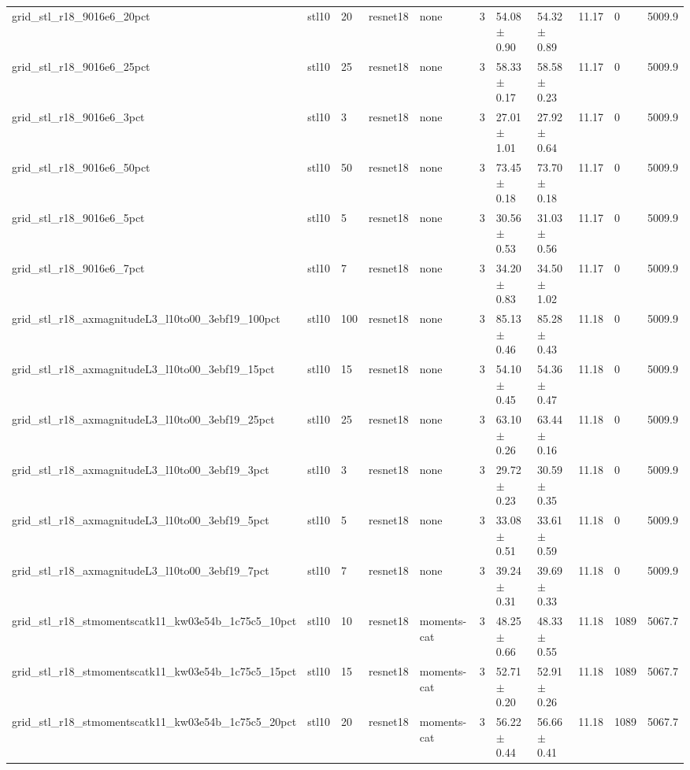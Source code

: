 \begin{tabular}{lllllllllll}
grid_stl_r18_9016e6_20pct & stl10 & 20 & resnet18 & none & 3 & 54.08 $\pm$ 0.90 & 54.32 $\pm$ 0.89 & 11.17 & 0 & 5009.9 \\
grid_stl_r18_9016e6_25pct & stl10 & 25 & resnet18 & none & 3 & 58.33 $\pm$ 0.17 & 58.58 $\pm$ 0.23 & 11.17 & 0 & 5009.9 \\
grid_stl_r18_9016e6_3pct & stl10 & 3 & resnet18 & none & 3 & 27.01 $\pm$ 1.01 & 27.92 $\pm$ 0.64 & 11.17 & 0 & 5009.9 \\
grid_stl_r18_9016e6_50pct & stl10 & 50 & resnet18 & none & 3 & 73.45 $\pm$ 0.18 & 73.70 $\pm$ 0.18 & 11.17 & 0 & 5009.9 \\
grid_stl_r18_9016e6_5pct & stl10 & 5 & resnet18 & none & 3 & 30.56 $\pm$ 0.53 & 31.03 $\pm$ 0.56 & 11.17 & 0 & 5009.9 \\
grid_stl_r18_9016e6_7pct & stl10 & 7 & resnet18 & none & 3 & 34.20 $\pm$ 0.83 & 34.50 $\pm$ 1.02 & 11.17 & 0 & 5009.9 \\
grid_stl_r18_axmagnitudeL3_l10to00_3ebf19_100pct & stl10 & 100 & resnet18 & none & 3 & 85.13 $\pm$ 0.46 & 85.28 $\pm$ 0.43 & 11.18 & 0 & 5009.9 \\
grid_stl_r18_axmagnitudeL3_l10to00_3ebf19_15pct & stl10 & 15 & resnet18 & none & 3 & 54.10 $\pm$ 0.45 & 54.36 $\pm$ 0.47 & 11.18 & 0 & 5009.9 \\
grid_stl_r18_axmagnitudeL3_l10to00_3ebf19_25pct & stl10 & 25 & resnet18 & none & 3 & 63.10 $\pm$ 0.26 & 63.44 $\pm$ 0.16 & 11.18 & 0 & 5009.9 \\
grid_stl_r18_axmagnitudeL3_l10to00_3ebf19_3pct & stl10 & 3 & resnet18 & none & 3 & 29.72 $\pm$ 0.23 & 30.59 $\pm$ 0.35 & 11.18 & 0 & 5009.9 \\
grid_stl_r18_axmagnitudeL3_l10to00_3ebf19_5pct & stl10 & 5 & resnet18 & none & 3 & 33.08 $\pm$ 0.51 & 33.61 $\pm$ 0.59 & 11.18 & 0 & 5009.9 \\
grid_stl_r18_axmagnitudeL3_l10to00_3ebf19_7pct & stl10 & 7 & resnet18 & none & 3 & 39.24 $\pm$ 0.31 & 39.69 $\pm$ 0.33 & 11.18 & 0 & 5009.9 \\
grid_stl_r18_stmomentscatk11_kw03e54b_1c75c5_10pct & stl10 & 10 & resnet18 & moments-cat & 3 & 48.25 $\pm$ 0.66 & 48.33 $\pm$ 0.55 & 11.18 & 1089 & 5067.7 \\
grid_stl_r18_stmomentscatk11_kw03e54b_1c75c5_15pct & stl10 & 15 & resnet18 & moments-cat & 3 & 52.71 $\pm$ 0.20 & 52.91 $\pm$ 0.26 & 11.18 & 1089 & 5067.7 \\
grid_stl_r18_stmomentscatk11_kw03e54b_1c75c5_20pct & stl10 & 20 & resnet18 & moments-cat & 3 & 56.22 $\pm$ 0.44 & 56.66 $\pm$ 0.41 & 11.18 & 1089 & 5067.7 \\

\end{tabular}
